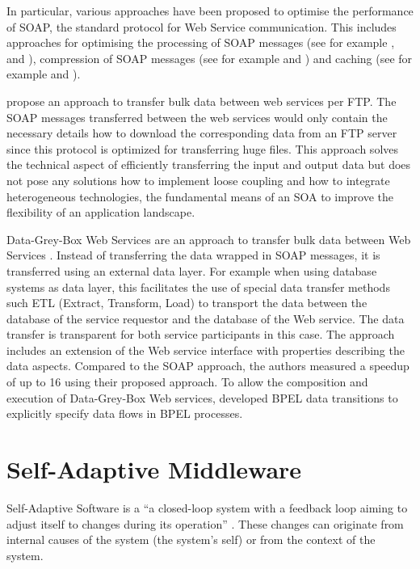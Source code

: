 In particular, various approaches have been proposed to optimise the performance of SOAP, the standard protocol for Web Service communication. This includes approaches for optimising the processing of SOAP messages (see for example \citet{Abu-Ghazaleh:2005bs}, \citet{Suzumura:2005fv} and \citet{Ng:2006kl}), compression of SOAP messages (see for example \citet{Estrella:2008dz} and \citet{Ng:2005qa}) and caching (see for example \citet{andresen2004lye} and \citet{Devaram:2003fu}).

\citet{Wichaiwong:2007oq} propose an approach to transfer bulk data between web services per FTP. The SOAP messages transferred between the web services would only contain the necessary details how to download the corresponding data from an FTP server since this protocol is optimized for transferring huge files. This approach solves the technical aspect of efficiently transferring the input and output data but does not pose any solutions how to implement loose coupling and how to integrate heterogeneous technologies, the fundamental means of an SOA to improve the flexibility of an application landscape.

Data-Grey-Box Web Services are an approach to transfer bulk data between Web Services \citep{Habich:2007ij}. Instead of transferring the data wrapped in SOAP messages, it is transferred using an external data layer. For example when using database systems as data layer, this facilitates the use of special data transfer methods such ETL (Extract, Transform, Load) to transport the data between the database of the service requestor and the database of the Web service. The data transfer is transparent for both service participants in this case. The approach includes an extension of the Web service interface with properties describing the data aspects. Compared to the SOAP approach, the authors measured a speedup of up to 16 using their proposed approach. To allow the composition and execution of Data-Grey-Box Web services,  \citet{Habich:kl} developed BPEL data transitions to explicitly specify data flows in BPEL processes.
\section{Self-Adaptive Middleware}
Self-Adaptive Software is a ``a closed-loop system with a feedback loop aiming to adjust itself to changes during its operation'' \citep{Salehie:2009pi}. These changes can originate from internal causes of the system (the system's self) or from the context of the system.

